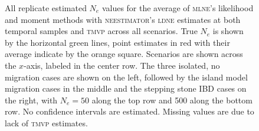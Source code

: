 \begin{landscape}
\begin{figure}[ht]
\centering
{}
\caption[ ~~ - All replicate estimated $N_e$ values for the average of \textsc{mlne}'s likelihood and moment methods with \textsc{neestimator}'s \textsc{ldne} estimates at both temporal samples and \textsc{tmvp} across all scenarios.]{All replicate estimated $N_e$ values for the average of \textsc{mlne}'s likelihood and moment methods with \textsc{neestimator}'s \textsc{ldne} estimates at both temporal samples and \textsc{tmvp} across all scenarios. True $N_e$ is shown by the horizontal green lines, point estimates in red with their average indicate by the orange square. Scenarios are shown across the $x$-axis, labeled in the center row. The three isolated, no migration cases are shown on the left, followed by the island model migration cases in the middle and the stepping stone IBD cases on the right, with $N_e = 50$ along the top row and 500 along the bottom row. No confidence intervals are estimated. Missing values are due to lack of \textsc{tmvp} estimates.}
\label{fig:supp_avg5}
\end{figure}



\end{landscape}






